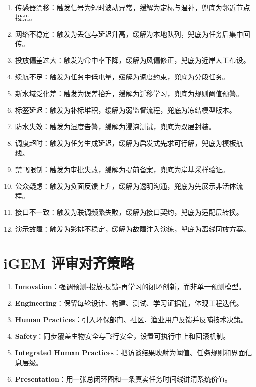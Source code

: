 \documentclass[12pt,a4paper,openany]{ctexrep}
\begin{document}
\begin{enumerate}
\item 传感器漂移：触发信号为短时波动异常，缓解为定标与温补，兜底为邻近节点投票。
\item 网络不稳定：触发为丢包与延迟升高，缓解为本地队列，兜底为任务后集中回传。
\item 投放偏差过大：触发为命中率下降，缓解为风偏修正，兜底为近岸人工布设。
\item 续航不足：触发为任务中低电量，缓解为调度约束，兜底为分段任务。
\item 新水域泛化差：触发为误差抬升，缓解为迁移学习，兜底为规则阈值预警。
\item 标签延迟：触发为补标堆积，缓解为弱监督流程，兜底为冻结模型版本。
\item 防水失效：触发为湿度告警，缓解为浸泡测试，兜底为双层封装。
\item 调度超时：触发为任务生成延迟，缓解为启发式先求可行解，兜底为模板航线。
\item 禁飞限制：触发为审批失败，缓解为提前备案，兜底为岸基采样验证。
\item 公众疑虑：触发为负面反馈上升，缓解为透明沟通，兜底为先展示非活体流程。
\item 接口不一致：触发为联调频繁失败，缓解为接口契约，兜底为适配层转换。
\item 演示故障：触发为彩排不稳定，缓解为故障注入演练，兜底为离线回放方案。
\end{enumerate}

\chapter{iGEM 评审对齐策略}

\begin{enumerate}
\item \textbf{Innovation}：强调预测-投放-反馈-再学习的闭环创新，而非单一预测模型。
\item \textbf{Engineering}：保留每轮设计、构建、测试、学习证据链，体现工程迭代。
\item \textbf{Human Practices}：引入环保部门、社区、渔业用户反馈并反哺技术决策。
\item \textbf{Safety}：同步覆盖生物安全与飞行安全，设置可执行中止和回滚机制。
\item \textbf{Integrated Human Practices}：把访谈结果映射为阈值、任务规则和界面信息层级。
\item \textbf{Presentation}：用一张总闭环图和一条真实任务时间线讲清系统价值。
\end{enumerate}
\end{document}
